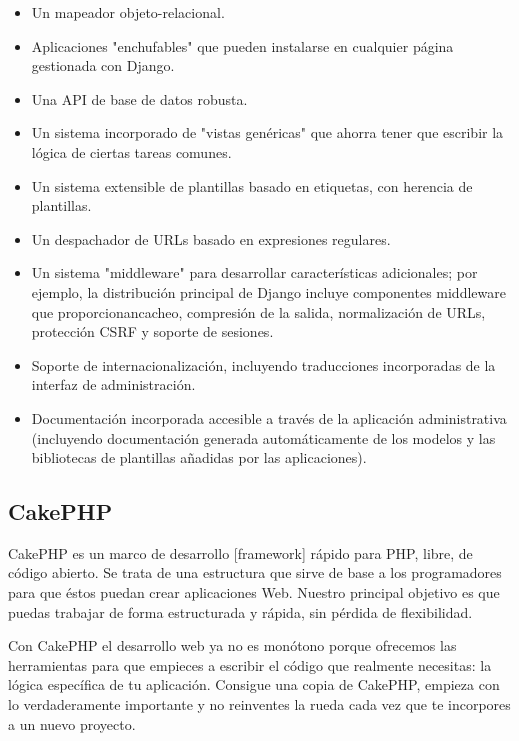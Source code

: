 \begin{itemize}

	\item Un mapeador objeto-relacional.
	
	\item Aplicaciones "enchufables" que pueden instalarse en cualquier página gestionada con Django.
	
	\item Una API de base de datos robusta.
	
	\item Un sistema incorporado de "vistas genéricas" que ahorra tener que escribir la lógica de ciertas tareas comunes.
	
	\item Un sistema extensible de plantillas basado en etiquetas, con herencia de plantillas.
	
	\item Un despachador de URLs basado en expresiones regulares.
	
	\item Un sistema "middleware" para desarrollar características adicionales; por ejemplo, la distribución principal de Django incluye componentes middleware que proporcionancacheo, compresión de la salida, normalización de URLs, protección CSRF y soporte de sesiones.
	
	\item Soporte de internacionalización, incluyendo traducciones incorporadas de la interfaz de administración.
	
	\item Documentación incorporada accesible a través de la aplicación administrativa (incluyendo documentación generada automáticamente de los modelos y las bibliotecas de plantillas añadidas por las aplicaciones).


	
	
\end{itemize}

\subsection{CakePHP}

CakePHP es un marco de desarrollo [framework] rápido para PHP, libre, de código abierto. Se trata de una estructura que sirve de base a los programadores para que éstos puedan crear aplicaciones Web. Nuestro principal objetivo es que puedas trabajar de forma estructurada y rápida, sin pérdida de flexibilidad.

Con CakePHP el desarrollo web ya no es monótono porque ofrecemos las herramientas para que empieces a escribir el código que realmente necesitas: la lógica específica de tu aplicación. Consigue una copia de CakePHP, empieza con lo verdaderamente importante y no reinventes la rueda cada vez que te incorpores a un nuevo proyecto.

